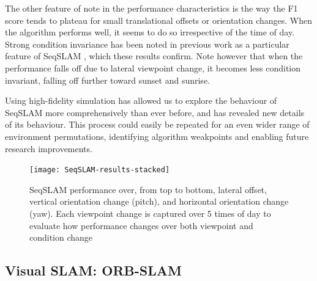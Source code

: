 \documentclass[letterpaper, 10 pt, conference]{ieeeconf}  %
\begin{document}
The other feature of note in the performance characteristics is the way the F1 score tends to plateau for small translational offsets or orientation changes. When the algorithm performs well, it seems to do so irrespective of the time of day. Strong condition invariance has been noted in previous work as a particular feature of SeqSLAM \cite{Milford2012}, which these results confirm. Note however that when the performance falls off due to lateral viewpoint change, it becomes less condition invariant, falling off further toward sunset and sunrise.

Using high-fidelity simulation has allowed us to explore the behaviour of SeqSLAM more comprehensively than ever before, and has revealed new details of its behaviour. This process could easily be repeated for an even wider range of environment permutations, identifying algorithm weakpoints and enabling future research improvements.

\begin{figure}[t]
    \centering
    \texttt{[image: SeqSLAM-results-stacked]}
    \caption{SeqSLAM performance over, from top to bottom, lateral offset, vertical orientation change (pitch), and horizontal orientation change (yaw). Each viewpoint change is captured over 5 times of day to evaluate how performance changes over both viewpoint and condition change}
    \label{fig:seqslam-results-stacked}
\end{figure}




\subsection{Visual SLAM: ORB-SLAM}
\end{document}
